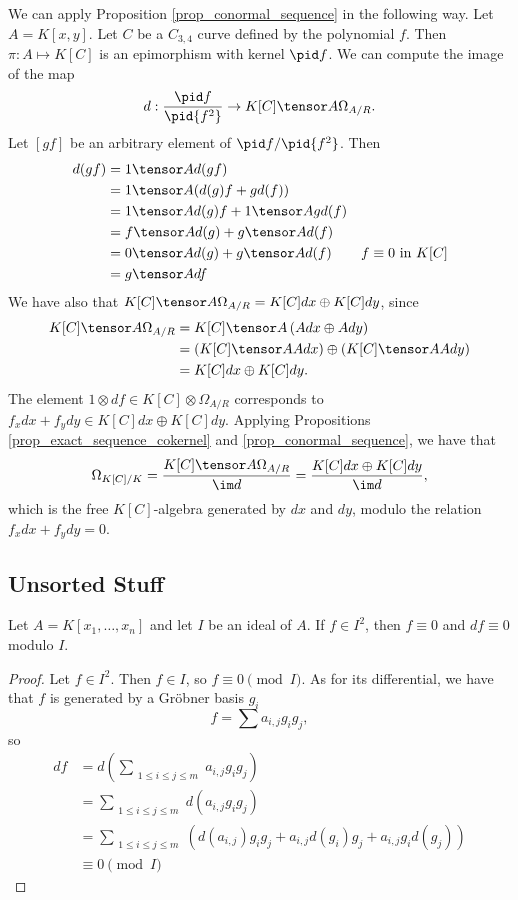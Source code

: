 We can apply Proposition \ref{prop_conormal_sequence} in the following way.
Let $A = K[x,y]$.
Let $C$ be a $C_{3,4}$ curve defined by the polynomial $f$.
Then $\pi : A \mapsto K[C]$ is an epimorphism with kernel $\pid f$.
We can compute the image of the map
  \[ d : \frac{\pid f}{\pid{f^2}} \to K[C] \tensor A \Omega_{A/R}. \]
Let $[gf]$ be an arbitrary element of $\pid f / \pid{f^2}$. Then
\begin{align*}
  d(gf)
    &= 1 \tensor A d(gf) \\
    &= 1 \tensor A (d(g)f + gd(f)) \\
    &= 1 \tensor A d(g)f + 1 \tensor A gd(f) \\
    &= f \tensor A d(g) + g \tensor A d(f) \\
    &= 0 \tensor A d(g) + g \tensor A d(f)
      & f \equiv 0 \text{ in } K[C] \\
    &= g \tensor A df
\end{align*}
We have also that $K[C] \tensor A \Omega_{A/R} = K[C]dx \oplus K[C]dy$, since
\begin{align*}
  K[C] \tensor A \Omega_{A/R}
    &= K[C] \tensor A \left( Adx \oplus Ady \right) \\
    &= \left( K[C] \tensor A Adx \right) \oplus \left( K[C] \tensor A Ady \right) \\
    &= K[C]dx \oplus K[C]dy.
\end{align*}
The element $1 \otimes df \in K[C] \otimes \Omega_{A/R}$ corresponds to $f_xdx + f_ydy \in K[C]dx \oplus K[C]dy$.
Applying Propositions \ref{prop_exact_sequence_cokernel} and \ref{prop_conormal_sequence},
we have that
  \[ \Omega_{K[C]/K} = \frac {K[C] \tensor A \Omega_{A/R}} {\im d} = \frac {K[C]dx \oplus K[C]dy} {\im d}, \]
which is the free $K[C]$-algebra generated by $dx$ and $dy$, modulo the relation $f_xdx + f_ydy = 0$.






\subsection{Unsorted Stuff}

\begin{theorem}
  Let $A = K[x_1, \ldots, x_n]$ and let $I$ be an ideal of $A$.
  If $f \in I^2$, then $f \equiv 0$ and $df \equiv 0$ modulo $I$.
\end{theorem}
\begin{proof}
  Let $f \in I^2$.
  Then $f \in I$, so $f \equiv 0 \pmod I$.
  As for its differential, we have that $f$ is generated by a Gr\"obner basis {$g_i$}
  \[ f = \sum a_{i,j}g_ig_j, \]
  so
  \begin{align*}
    df &= d \left( \sum_{\substack{1 \leq i \leq j \leq m}} a_{i,j}g_ig_j \right) \\
       &= \sum_{\substack{1 \leq i \leq j \leq m}} d \left( a_{i,j}g_ig_j \right) \\
       &= \sum_{\substack{1 \leq i \leq j \leq m}} \left( d(a_{i,j})g_ig_j + a_{i,j}d(g_i)g_j + a_{i,j}g_id(g_j) \right) \\
       &\equiv 0 \pmod I
  \end{align*}
\end{proof}

